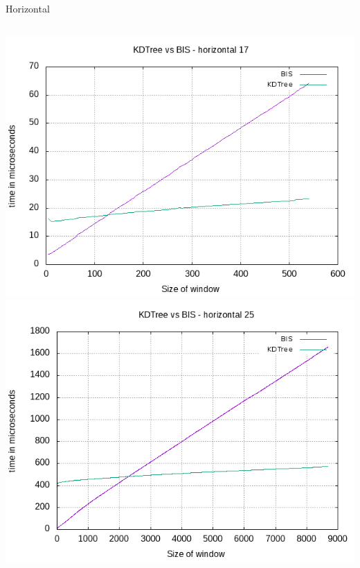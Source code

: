 \documentclass[pdf]{beamer}
\begin{document}
\begin{frame}{Horizontal}
  \begin{columns}
    \includegraphics[scale=0.34]{pictures/analysis/hori_17.png}
    \includegraphics[scale=0.34]{pictures/analysis/hori_25.png}
  \end{columns}
\end{frame}
\end{document}
